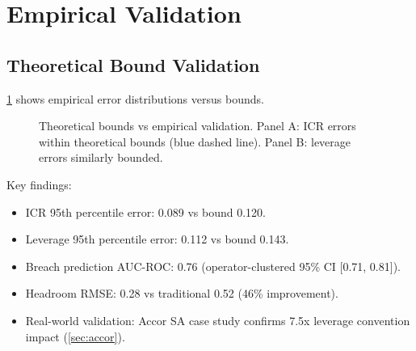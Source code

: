 \documentclass[11pt,a4paper]{article}
\theoremstyle{plain}
\theoremstyle{definition}
\newcommand{\Cref}[1]{\ref{#1}}
\begin{document}
\section{Empirical Validation}

\subsection{Theoretical Bound Validation}

\Cref{fig:theoretical_bounds} shows empirical error distributions versus bounds.

\begin{figure}[h]
\centering
{}
\caption{Theoretical bounds vs empirical validation. Panel A: ICR errors within theoretical bounds (blue dashed line). Panel B: leverage errors similarly bounded.}
\label{fig:theoretical_bounds}
\end{figure}

Key findings:
\begin{itemize}
\item ICR 95th percentile error: 0.089 vs bound 0.120.
\item Leverage 95th percentile error: 0.112 vs bound 0.143.
\item Breach prediction AUC-ROC: 0.76 (operator-clustered 95\% CI [0.71, 0.81]).
\item Headroom RMSE: 0.28 vs traditional 0.52 (46\% improvement).
\item Real-world validation: Accor SA case study confirms 7.5x leverage convention impact (\Cref{sec:accor}).
\end{itemize}
\end{document}
